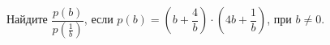 \begin{ex}
	\begin{condition}
		Найдите \( \dfrac{p(b)}{p\left( \frac{1}{b} \right)} \), если \( p(b)=\left( b+\dfrac{4}{b} \right)\cdot\left( 4b+\dfrac{1}{b} \right) \), при \( b\neq0 \).
	\end{condition}
\end{ex}